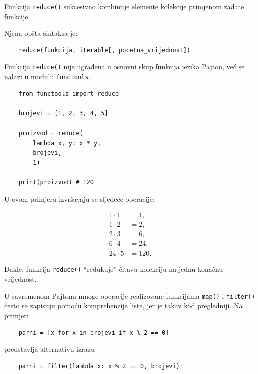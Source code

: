 
Funkcija \texttt{reduce()} sukcesivno kombinuje elemente kolekcije primjenom zadate funkcije.

Njena opšta sintaksa je:
\begin{verbatim}
	reduce(funkcija, iterable[, pocetna_vrijednost])
\end{verbatim}

Funkcija \texttt{reduce()} nije ugrađena u osnovni skup funkcija jezika Pajton, već se nalazi u modulu \texttt{functools}.

\begin{verbatim}
	from functools import reduce
	
	brojevi = [1, 2, 3, 4, 5]
	
	proizvod = reduce(
	    lambda x, y: x * y,
	    brojevi,
	    1)
	
	print(proizvod) # 120
\end{verbatim}

U ovom primjeru izvršavaju se sljedeće operacije:

\begin{align*}
	1 \cdot 1 &= 1,\\
	1 \cdot 2 &= 2,\\
	2 \cdot 3 &= 6,\\
	6 \cdot 4 &= 24,\\
	24 \cdot 5 &= 120.
\end{align*}

Dakle, funkcija \texttt{reduce()} ``redukuje'' čitavu kolekciju na jednu konačnu vrijednost.


U savremenom Pajtonu mnoge operacije realizovane funkcijama \texttt{map()} i \texttt{filter()} često se zapisuju pomoću komprehenzije liste, jer je takav k\^od pregledniji. Na primjer:

\begin{verbatim}
	parni = [x for x in brojevi if x % 2 == 0]
\end{verbatim}

predstavlja alternativu izrazu

\begin{verbatim}
	parni = filter(lambda x: x % 2 == 0, brojevi)
\end{verbatim}

